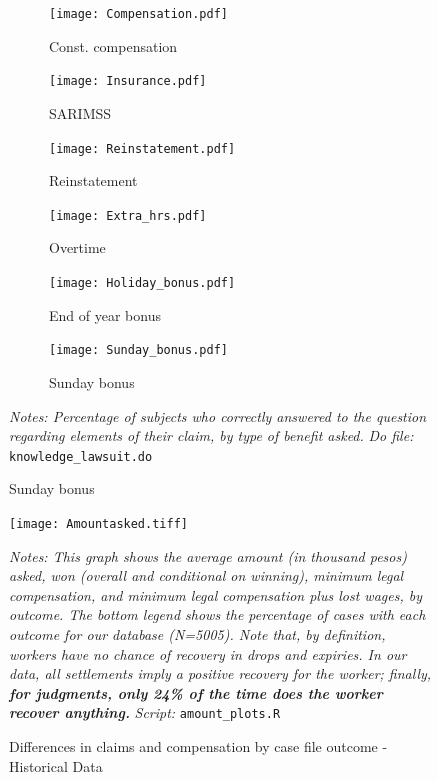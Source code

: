 \documentclass[11pt]{article}
\begin{document}
\begin{figure}[H]
    \caption{Knowledge about their own claims in lawsuit - Pilot}
    \label{Knowtheirclaimsfig}
    \begin{center}
        \begin{subfigure}{0.49\textwidth}
            \caption{Const. compensation}
            \centering
            \texttt{[image: Compensation.pdf]}
        \end{subfigure}
        \begin{subfigure}{0.49\textwidth}
            \caption{SARIMSS}
                \centering
                \texttt{[image: Insurance.pdf]}
        \end{subfigure}
        \begin{subfigure}{0.49\textwidth}
            \caption{Reinstatement}
            \centering
            \texttt{[image: Reinstatement.pdf]}
        \end{subfigure}
            \hfill
        \begin{subfigure}{0.49\textwidth}
            \caption{Overtime}
            \centering
            \texttt{[image: Extra\_hrs.pdf]}
        \end{subfigure}
        \begin{subfigure}{0.49\textwidth}
            \caption{End of year bonus}
            \centering
            \texttt{[image: Holiday\_bonus.pdf]}
        \end{subfigure}
            \hfill
        \begin{subfigure}{0.49\textwidth}
            \caption{Sunday bonus}
            \centering
            \texttt{[image: Sunday\_bonus.pdf]}
        \end{subfigure}
    \end{center} 
        \footnotesize \textit{Notes: Percentage of subjects who correctly answered to the question regarding elements of their claim, by type of benefit asked.}
        {\footnotesize \textit{Do file: }  \texttt{knowledge\_lawsuit.do}}
\end{figure}

 
    
\begin{figure}[H]
    \caption{Differences in claims and compensation by case file outcome - Historical Data}
    \label{claimsvsoutcomes}
    \begin{center}
        \texttt{[image: Amountasked.tiff]}
        \end{center}
    \footnotesize \textit{Notes: This graph shows the average amount (in thousand pesos) asked, won (overall and conditional on winning), minimum legal compensation, and minimum legal compensation plus lost wages, by outcome. The bottom legend shows the percentage of cases with each outcome for our database (N=5005). Note that, by definition, workers have no chance of recovery in drops and expiries. In our data, all settlements imply a positive recovery for the worker; finally, \textbf{for judgments, only 24\% of the time does the worker recover anything.}} 
    {\footnotesize \textit{Script: } \texttt{amount\_plots.R}}
\end{figure}
\end{document}
